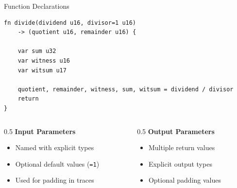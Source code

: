 \documentclass[aspectratio=169,11pt]{beamer}
\begin{document}
\begin{frame}[fragile]{Function Declarations}

\begin{lstlisting}[style=zkasm]
fn divide(dividend u16, divisor=1 u16)
    -> (quotient u16, remainder u16) {

    var sum u32
    var witness u16
    var witsum u17

    quotient, remainder, witness, sum, witsum = dividend / divisor
    return
}
\end{lstlisting}

\vspace{0.5em}

\begin{columns}
\begin{column}{0.5\textwidth}
\textbf{Input Parameters}
\begin{itemize}
    \item Named with explicit types
    \item Optional default values (\texttt{=1})
    \item Used for padding in traces
\end{itemize}
\end{column}

\begin{column}{0.5\textwidth}
\textbf{Output Parameters}
\begin{itemize}
    \item Multiple return values
    \item Explicit output types
    \item Optional padding values
\end{itemize}
\end{column}
\end{columns}
\end{frame}
\end{document}
